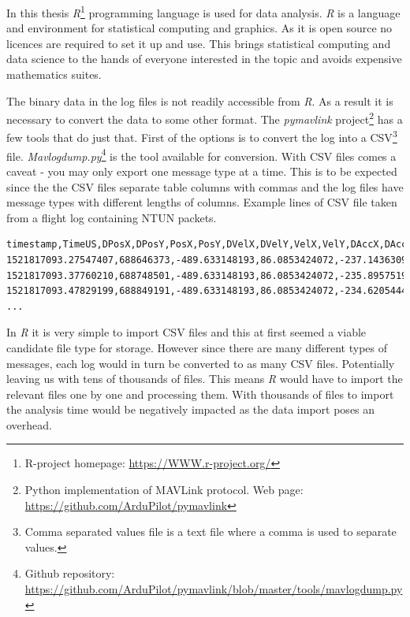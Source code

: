 \documentclass[12pt,oneside]{reedthesis}
\theoremstyle{definition}
\theoremstyle{definition}
\theoremstyle{definition}
\theoremstyle{remark}
\begin{document}
In this thesis \emph{R}\footnote{R-project homepage:
  \url{https://WWW.r-project.org/}} programming language is used for
data analysis. \emph{R} is a language and environment for statistical
computing and graphics. As it is open source no licences are required to
set it up and use. This brings statistical computing and data science to
the hands of everyone interested in the topic and avoids expensive
mathematics suites.

The binary data in the log files is not readily accessible from
\emph{R}. As a result it is necessary to convert the data to some other
format. The \emph{pymavlink} project\footnote{Python implementation of
  MAVLink protocol. Web page:
  \url{https://github.com/ArduPilot/pymavlink}} has a few tools that do
just that. First of the options is to convert the log into a
CSV\footnote{Comma separated values file is a text file where a comma is
  used to separate values.} file. \emph{Mavlogdump.py}\footnote{Github
  repository:
  \url{https://github.com/ArduPilot/pymavlink/blob/master/tools/mavlogdump.py}}
is the tool available for conversion. With CSV files comes a caveat -
you may only export one message type at a time. This is to be expected
since the the CSV files separate table columns with commas and the log
files have message types with different lengths of columns. Example
lines of CSV file taken from a flight log containing NTUN packets.
\begin{verbatim}
timestamp,TimeUS,DPosX,DPosY,PosX,PosY,DVelX,DVelY,VelX,VelY,DAccX,DAccY
1521817093.27547407,688646373,-489.633148193,86.0853424072,-237.143630981...
1521817093.37760210,688748501,-489.633148193,86.0853424072,-235.895751953...
1521817093.47829199,688849191,-489.633148193,86.0853424072,-234.620544434...
...
\end{verbatim}
In \emph{R} it is very simple to import CSV files and this at first
seemed a viable candidate file type for storage. However since there are
many different types of messages, each log would in turn be converted to
as many CSV files. Potentially leaving us with tens of thousands of
files. This means \emph{R} would have to import the relevant files one
by one and processing them. With thousands of files to import the
analysis time would be negatively impacted as the data import poses an
overhead.
\end{document}
